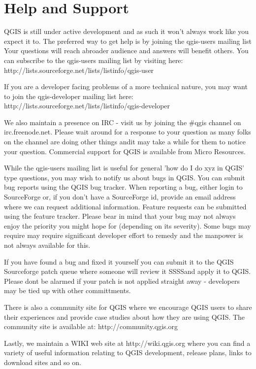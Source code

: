 \section{Help and Support}\label{label_helpsupport}

QGIS is still under active development and as such it won't always work like
you expect it to. The preferred way to get help is by joining the qgis-users
mailing list Your questions will reach abroader audience and answers will
benefit others. You can subscribe to the qgis-users mailing list by visiting
here: http://lists.sourceforge.net/lists/listinfo/qgis-user

If you are a developer facing problems of a more technical nature, you may
want to join the qgis-developer mailing list here:
http://lists.sourceforge.net/lists/listinfo/qgis-developer

We also maintain a presence on IRC - visit us by joining the \#qgis channel on
irc.freenode.net. Please wait around for a response to your question as many
folks on the channel are doing other things andit may take a while for them to
notice your question. Commercial support for QGIS is available from Micro
Resources. 

While the qgis-users mailing list is useful for general 'how do I do xyz in
QGIS' type questions, you may wish to notify us about bugs in QGIS. You can
submit bug reports using the QGIS bug tracker. When reporting a bug, either
login to SourceForge or, if you don't have a SourceForge id, provide an email
address where we can request additional information.
Feature requests can be submitted using the feature tracker. Please bear in
mind that your bug may not always enjoy the priority you might hope for
(depending on its severity). Some bugs may require may require significant
developer effort to remedy and the manpower is not always available for this.

If you have found a bug and fixed it yourself you can submit it to the QGIS
Sourceforge patch queue where someone will review it SSSSand apply it to QGIS.
Please dont be alarmed if your patch is not applied straight away - developers
may be tied up with other committments.

There is also a community site for QGIS where we encourage QGIS users to share
their experiences and provide case studies about how they are using QGIS. The
community site is available at: http://community.qgis.org 

Lastly, we maintain a WIKI web site at http://wiki.qgis.org where you can find
a variety of useful information relating to QGIS development, release plans,
links to download sites and so on.
